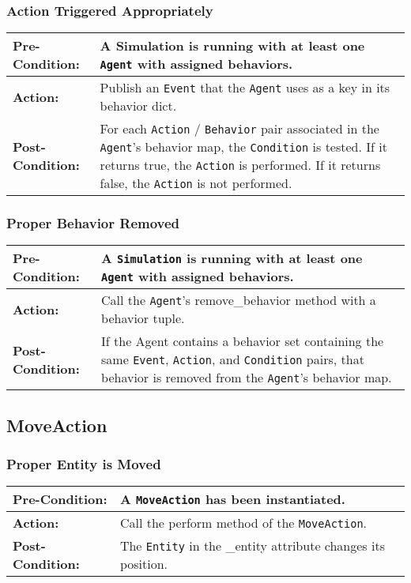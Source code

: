 \documentclass[titlepage]{article}
\newcommand{\testcase}[3]{
    \begin{center}
    \begin{tabular}{| l | p{0.7\textwidth}|}
        \hline
        \rowcolor[gray]{0.8}\textbf{Pre-Condition:} & #1 \\ \hline
        \textbf{Action:} & #2 \\ \hline
        \rowcolor[gray]{0.8}\textbf{Post-Condition:} & #3 \\ \hline
    \end{tabular}
    \end{center}
}
\begin{document}
\subsubsection{Action Triggered Appropriately}
\testcase{A Simulation is running with at least one \texttt{Agent} with assigned behaviors.}{Publish an \texttt{Event}
that the \texttt{Agent} uses as a key in its behavior dict.}{For each \texttt{Action} / \texttt{Behavior} pair
associated in the \texttt{Agent}'s behavior map, the \texttt{Condition} is tested.  If it returns true, the
\texttt{Action} is performed.  If it returns false, the \texttt{Action} is not performed.}

\subsubsection{Proper Behavior Removed}
\testcase{A \texttt{Simulation} is running with at least one \texttt{Agent} with assigned behaviors.}{Call the
\texttt{Agent}'s remove\_behavior method with a behavior tuple.}{If the Agent contains a behavior set containing the
same \texttt{Event}, \texttt{Action}, and \texttt{Condition} pairs, that behavior is removed from the \texttt{Agent}'s
behavior map.}



\subsection{MoveAction}
\subsubsection{Proper Entity is Moved}
\testcase{A \texttt{MoveAction} has been instantiated.}{Call the perform method of the \texttt{MoveAction}.}{The
\texttt{Entity} in the \_entity attribute changes its position.}
\end{document}
